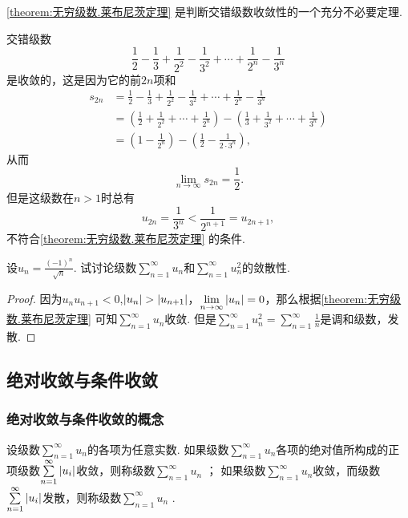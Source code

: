 \cref{theorem:无穷级数.莱布尼茨定理} 是判断交错级数收敛性的一个充分不必要定理.
\begin{example}
交错级数\[
\frac{1}{2} - \frac{1}{3}
+ \frac{1}{2^2} - \frac{1}{3^2}
+ \dotsm + \frac{1}{2^n} - \frac{1}{3^n}
\]是收敛的，这是因为它的前\(2n\)项和\begin{align*}
s_{2n} &= \frac{1}{2} - \frac{1}{3}
+ \frac{1}{2^2} - \frac{1}{3^2}
+ \dotsm + \frac{1}{2^n} - \frac{1}{3^n} \\
&= \left(\frac{1}{2} + \frac{1}{2^2} + \dotsm + \frac{1}{2^n}\right)
 - \left(\frac{1}{3} + \frac{1}{3^2} + \dotsm + \frac{1}{3^n}\right) \\
&= \left(1 - \frac{1}{2^n}\right)
 - \left(\frac{1}{2} - \frac{1}{2\cdot3^n}\right),
\end{align*}从而\[
\lim\limits_{n\to\infty} s_{2n} = \frac{1}{2}.
\]但是这级数在\(n>1\)时总有\[
u_{2n} = \frac{1}{3^n} < \frac{1}{2^{n+1}} = u_{2n+1},
\]不符合\cref{theorem:无穷级数.莱布尼茨定理} 的条件.
\end{example}

\begin{example}
\def\s{\sum\limits_{n=1}^\infty }%
\def\l{\lim\limits_{n\to\infty}}%
设\(u_n = \frac{(-1)^n}{\sqrt{n}}\).
试讨论级数\(\s u_n\)和\(\s u_n^2\)的敛散性.
\begin{proof}
因为\(u_n u_{n+1} < 0\),\(\abs{u_n} > \abs{u_{n+1}}\)，\(\l \abs{u_n} = 0\)，那么根据\cref{theorem:无穷级数.莱布尼茨定理} 可知\(\s u_n\)收敛.
但是\(\s u_n^2 = \s \frac{1}{n}\)是调和级数，发散.
\end{proof}
\end{example}

\subsection{绝对收敛与条件收敛}
\subsubsection{绝对收敛与条件收敛的概念}
\begin{definition}
设级数\(\sum\limits_{n=1}^\infty u_n\)的各项为任意实数.
如果级数\(\sum\limits_{n=1}^\infty u_n\)各项的绝对值所构成的正项级数\(\s {\abs{u_i}}\)收敛，则称级数\(\sum\limits_{n=1}^\infty u_n\) ；
如果级数\(\sum\limits_{n=1}^\infty u_n\)收敛，而级数\(\s {\abs{u_i}}\)发散，则称级数\(\sum\limits_{n=1}^\infty u_n\) .
\end{definition}

